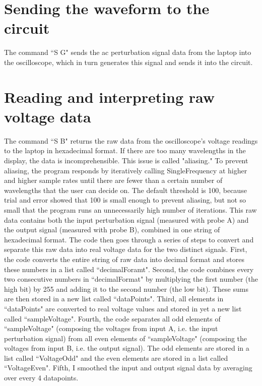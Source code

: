 \section{Sending the waveform to the circuit}
The command ``S G" sends the ac perturbation signal data from the laptop into the oscilloscope, which in turn generates this signal and sends it into the circuit. 
	\section{Reading and interpreting raw voltage data}
The command ``S B" returns the raw data from the oscilloscope's voltage readings to the laptop in hexadecimal format.
If there are too many wavelengths in the display, the data is incomprehensible. This issue is called "aliasing." To prevent aliasing, the program responds by iteratively calling SingleFrequency at higher and higher sample rates until there are fewer than a certain number of wavelengths that the user can decide on. The default threshold is 100, because trial and error showed that 100 is small enough to prevent aliasing, but not so small that the program runs an unnecessarily high number of iterations.
This raw data contains both the input perturbation signal (measured with probe A) and the output signal (measured with probe B), combined in one string of hexadecimal format. The code then goes through a series of steps to convert and separate this raw data into real voltage data for the two distinct signals. First, the code converts the entire string of raw data into decimal format and stores these numbers in a list called ``decimalForamt". Second, the code combines every two consecutive numbers in ``decimalFormat" by multiplying the first number (the high bit) by 255 and adding it to the second number (the low bit). These sums are then stored in a new list called ``dataPoints".  Third, all elements in ``dataPoints" are converted to real voltage values and stored in yet a new list called ``sampleVoltage". Fourth, the code separates all odd elements of ``sampleVoltage" (composing the voltages from input A, i.e. the input perturbation signal) from all even elements of ``sampleVoltage" (composing the voltages from input B, i.e. the output signal). The odd elements are stored in a list called ``VoltageOdd" and the even elements are stored in a list called ``VoltageEven". Fifth, I smoothed the input and output signal data by averaging over every 4 datapoints. %
